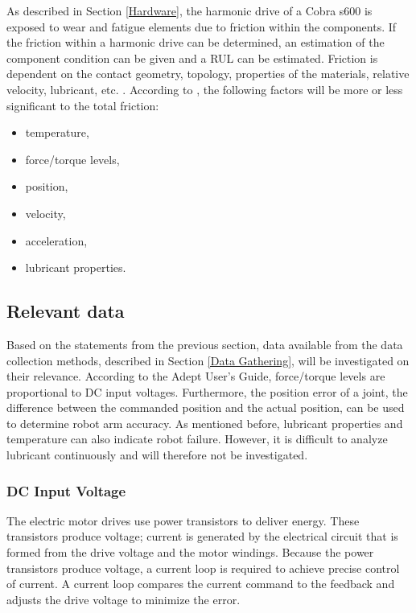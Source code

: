As described in Section \ref{Hardware}, the harmonic drive of a Cobra s600 is exposed to wear and fatigue elements due to friction within the components. If the friction within a harmonic drive can be determined, an estimation of the component condition can be given and a RUL can be estimated. Friction is dependent on the contact geometry, topology, properties of the materials, relative velocity, lubricant, etc. \parencite{Al-Bender2008}. According to \citet{Bittencourt2012}, the following factors will be more or less significant to the total friction:
\begin{multicols}{2}
\begin{itemize}
\item temperature,
\item force/torque levels,
\item position,
\item velocity,
\item acceleration,
\item lubricant properties.
\end{itemize}
\end{multicols} 

\subsection{Relevant data} \label{Relevant data}
Based on the statements from the previous section, data available from the data collection methods, described in Section \ref{Data Gathering}, will be investigated on their relevance. According to the Adept User's Guide, force/torque levels are proportional to DC input voltages. Furthermore, the position error of a joint, the difference between the commanded position and the actual position, can be used to determine robot arm accuracy. As mentioned before, lubricant properties and temperature can also indicate robot failure. However, it is difficult to analyze lubricant continuously and will therefore not be investigated.

\subsubsection{DC Input Voltage} \label{DC Input Voltage}
The electric motor drives use power transistors to deliver energy. These transistors produce voltage; current is generated by the electrical circuit that is formed from the drive voltage and the motor windings. Because the power transistors produce voltage, a current loop is required to achieve precise control of current. A current loop compares the current command to the feedback and adjusts the drive voltage to minimize the error. 

